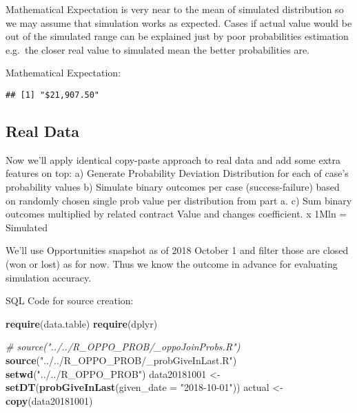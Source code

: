 \documentclass[]{article}
\newenvironment{Shaded}{\begin{snugshade}}{\end{snugshade}}
\newcommand{\CommentTok}[1]{\textcolor[rgb]{0.56,0.35,0.01}{\textit{#1}}}
\newcommand{\DataTypeTok}[1]{\textcolor[rgb]{0.13,0.29,0.53}{#1}}
\newcommand{\KeywordTok}[1]{\textcolor[rgb]{0.13,0.29,0.53}{\textbf{#1}}}
\newcommand{\NormalTok}[1]{#1}
\newcommand{\OperatorTok}[1]{\textcolor[rgb]{0.81,0.36,0.00}{\textbf{#1}}}
\newcommand{\StringTok}[1]{\textcolor[rgb]{0.31,0.60,0.02}{#1}}
\begin{document}
Mathematical Expectation is very near to the mean of simulated
distribution so we may assume that simulation works as expected. Cases
if actual value would be out of the simulated range can be explained
just by poor probabilities estimation e.g.~the closer real value to
simulated mean the better probabilities are.

Mathematical Expectation:

\begin{Shaded}
\end{Shaded}

\begin{verbatim}
## [1] "$21,907.50"
\end{verbatim}

\newpage

\hypertarget{real-data}{%
\subsection{Real Data}\label{real-data}}

Now we'll apply identical copy-paste approach to real data and add some
extra features on top: a) Generate Probability Deviation Distribution
for each of case's probability values b) Simulate binary outcomes per
case (success-failure) based on randomly chosen single prob value per
distribution from part a. c) Sum binary outcomes multiplied by related
contract Value and changes coefficient. x 1Mln = Simulated

We'll use Opportunities snapshot as of 2018 October 1 and filter those
are closed (won or lost) as for now. Thus we know the outcome in advance
for evaluating simulation accuracy.

\scriptsize

SQL Code for source creation:

\begin{Shaded}
\begin{Highlighting}[]
\KeywordTok{require}\NormalTok{(data.table)}
\KeywordTok{require}\NormalTok{(dplyr)}

\CommentTok{# source("../../R_OPPO_PROB/_oppoJoinProbs.R")}
\KeywordTok{source}\NormalTok{(}\StringTok{"../../R_OPPO_PROB/_probGiveInLast.R"}\NormalTok{)}
\KeywordTok{setwd}\NormalTok{(}\StringTok{"../../R_OPPO_PROB"}\NormalTok{)}
\NormalTok{data20181001 <-}\StringTok{ }\KeywordTok{setDT}\NormalTok{(}\KeywordTok{probGiveInLast}\NormalTok{(}\DataTypeTok{given_date =} \StringTok{"2018-10-01"}\NormalTok{))}
\NormalTok{actual <-}\StringTok{ }\KeywordTok{copy}\NormalTok{(data20181001)}
\end{Highlighting}
\end{Shaded}
\end{document}
